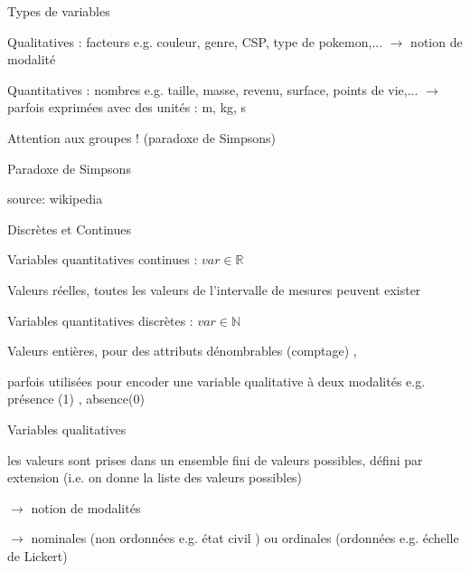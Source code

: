 \documentclass{beamer}
\begin{document}
\begin{frame}{Types de variables}


\alert{Qualitatives} : facteurs e.g. couleur, genre, CSP, type de pokemon,... 
  $\rightarrow$ notion de \alert{modalité}
 
\alert{Quantitatives} : nombres e.g. taille, masse, revenu, surface, points de vie,...  
$\rightarrow$ parfois exprimées avec des \alert{unités} : m, kg, s



\end{frame}



\begin{frame}{Attention aux groupes !  (paradoxe de Simpsons)}



Paradoxe de Simpsons

\begin{small}
source: wikipedia
\end{small}

\end{frame}





\begin{frame}{Discrètes et Continues}

Variables quantitatives \alert{continues} : $var \in \mathbb{R}$

Valeurs réelles,  toutes les valeurs de l'intervalle de mesures peuvent exister 


Variables quantitatives \alert{discrètes} : $var \in \mathbb{N}$ 

Valeurs entières, pour des attributs \alert{dénombrables} (comptage) , 

parfois utilisées pour encoder une variable qualitative à deux modalités e.g. présence (1) , absence(0)

\end{frame}


\begin{frame}{Variables \alert{qualitatives} }

les valeurs sont prises dans un ensemble \alert{fini} de valeurs possibles, défini par \alert{extension} (i.e. on donne la liste des valeurs possibles)


$\rightarrow$ notion de \alert{modalités} 


$\rightarrow$ \alert{nominales} (non ordonnées e.g. état civil ) ou \alert{ordinales} (ordonnées e.g. échelle de Lickert) 


\end{frame}
\end{document}
